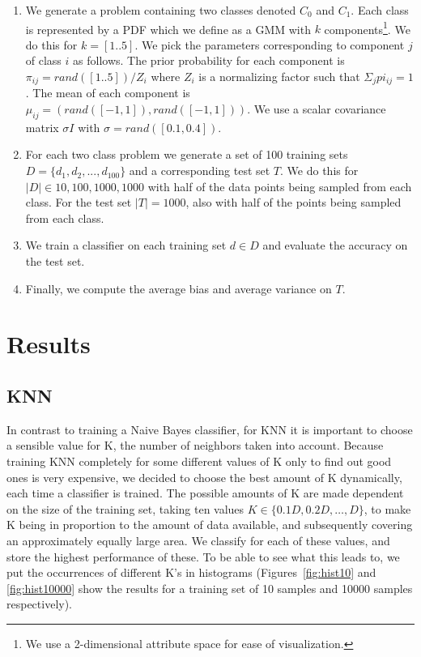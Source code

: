 \documentclass[a4paper]{article}
\begin{document}
\begin{enumerate}
\item We generate a problem containing two classes denoted $C_0$ and $C_1$. Each class is represented by a \ac{PDF} which we define as a \ac{GMM} with $k$ components\footnote{We use a 2-dimensional attribute space for ease of visualization.}. We do this for $k = [1 .. 5]$. We pick the parameters corresponding to component $j$ of class $i$ as follows. The prior probability for each component is $\pi_{ij} = rand([1 .. 5]) / Z_i$ where $Z_i$ is a normalizing factor such that $\Sigma_{j} pi_{ij} = 1$. The mean of each component is $\mu_{ij} = (rand([-1,1]),rand([-1,1]))$. We use a scalar covariance matrix $\sigma I$ with $\sigma = rand([0.1,0.4])$.
\item For each two class problem we generate a set of 100 training sets $D = \{d_1, d_2, ..., d_{100}\}$ and a corresponding test set $T$. We do this for $|D| \in {10, 100, 1000, 1000}$ with half of the data points being sampled from each class. For the test set $|T| = 1000$, also with half of the points being sampled from each class.
\item We train a classifier on each training set $d \in D$ and evaluate the accuracy on the test set.
\item Finally, we compute the average bias and average variance on $T$.
\end{enumerate}

\section{Results}
\label{sec:results}

\subsection{KNN}
In contrast to training a Naive Bayes classifier, for KNN it is important to choose a sensible value for K, the number of neighbors taken into account. Because training KNN completely for some different values of K only to find out good ones is very expensive, we decided to choose the best amount of K dynamically, each time a classifier is trained. The possible amounts of K are made dependent on the size of the training set, taking ten values $K \in \{0.1D,0.2D,\ldots,D\}$, to make K being in proportion to the amount of data available, and subsequently covering an approximately equally large area. We classify for each of these values, and store the highest performance of these. To be able to see what this leads to, we put the occurrences of different K's in histograms (Figures~\ref{fig:hist10} and \ref{fig:hist10000} show the results for a training set of 10 samples and 10000 samples respectively).
\end{document}
